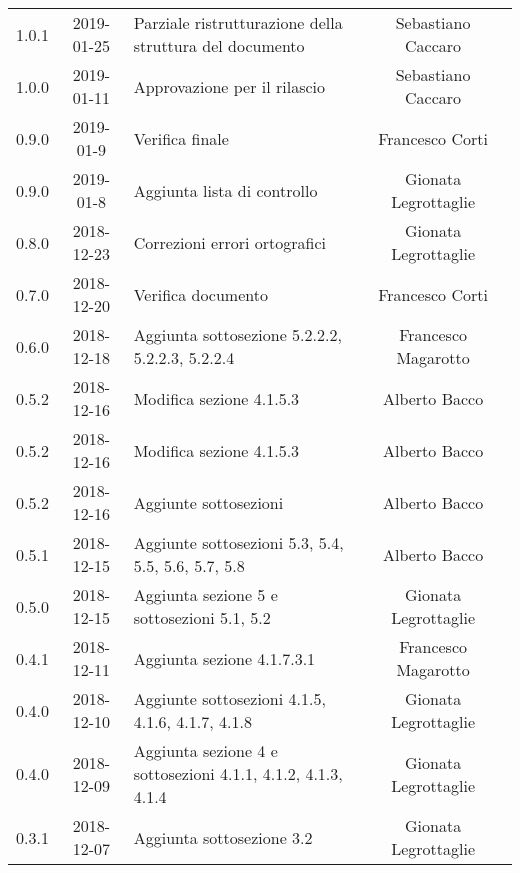 {\begin{longtable}{ c c C{4cm}  c  c }
		1.0.1 & 2019-01-25 & Parziale ristrutturazione della struttura del documento & Sebastiano Caccaro & \reda{} \\		
		
		1.0.0 & 2019-01-11 & Approvazione per il rilascio & Sebastiano Caccaro & \Res{} \\
		
		0.9.0 & 2019-01-9 & Verifica finale & Francesco Corti & \ver{} \\
		
		0.9.0 & 2019-01-8 & Aggiunta lista di controllo & Gionata Legrottaglie & \reda{} \\
		
		0.8.0 & 2018-12-23 & Correzioni errori ortografici & Gionata Legrottaglie & \reda{} \\
		
		0.7.0 & 2018-12-20 & Verifica documento & Francesco Corti & \ver{}\\
		
		0.6.0 & 2018-12-18 & Aggiunta sottosezione 5.2.2.2, 5.2.2.3, 5.2.2.4 & Francesco Magarotto & \reda{} \\
		
		0.5.2 & 2018-12-16 & Modifica sezione 4.1.5.3 & Alberto Bacco & \reda{} \\
		
		0.5.2 & 2018-12-16 & Modifica sezione 4.1.5.3 & Alberto Bacco & \reda{} \\
		
		0.5.2 & 2018-12-16 & Aggiunte sottosezioni  & Alberto Bacco & \reda{} \\
		
		0.5.1 & 2018-12-15 & Aggiunte sottosezioni 5.3, 5.4, 5.5, 5.6, 5.7, 5.8 & Alberto Bacco & \reda{} \\
		
		0.5.0 & 2018-12-15 & Aggiunta sezione 5 e sottosezioni 5.1, 5.2 & Gionata Legrottaglie & \reda{} \\
		
		0.4.1 & 2018-12-11 & Aggiunta sezione 4.1.7.3.1 & Francesco Magarotto & \reda{} \\ 
		
		0.4.0 & 2018-12-10 & Aggiunte sottosezioni 4.1.5, 4.1.6, 4.1.7, 4.1.8 & Gionata Legrottaglie & \reda{} \\ 
		0.4.0 & 2018-12-09 & Aggiunta sezione 4 e sottosezioni 4.1.1, 4.1.2, 4.1.3, 4.1.4 & Gionata Legrottaglie & \reda{} \\ 
		
		0.3.1 & 2018-12-07 & Aggiunta sottosezione 3.2 & Gionata Legrottaglie & \reda{} \\ 
		

\end{longtable}}
